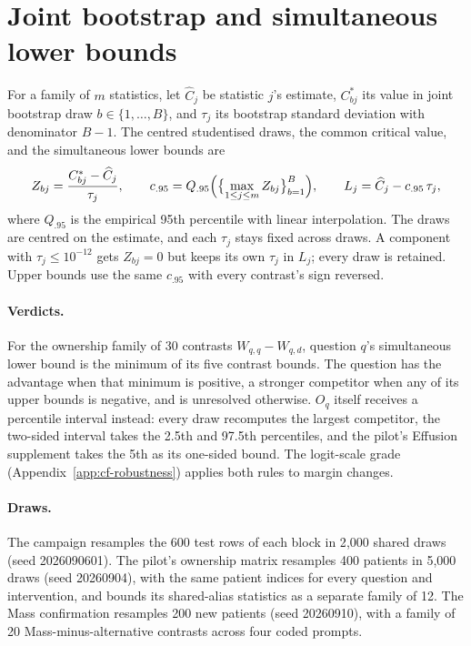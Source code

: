 \section{Joint bootstrap and simultaneous lower bounds}
\label{app:simultaneous-bounds}

For a family of $m$ statistics, let $\widehat C_j$ be statistic $j$'s estimate, $C^*_{bj}$ its value in joint bootstrap draw $b\in\{1,\dots,B\}$, and $\tau_j$ its bootstrap standard deviation with denominator $B-1$. The centred studentised draws, the common critical value, and the simultaneous lower bounds are
\begin{equation}
Z_{bj}=\frac{C^*_{bj}-\widehat C_j}{\tau_j},\qquad
c_{.95}=Q_{.95}\Bigl(\bigl\{\max_{1\leq j\leq m}Z_{bj}\bigr\}_{b=1}^{B}\Bigr),\qquad
L_j=\widehat C_j-c_{.95}\,\tau_j,
\label{eq:max-t}
\end{equation}
where $Q_{.95}$ is the empirical 95th percentile with linear interpolation. The draws are centred on the estimate, and each $\tau_j$ stays fixed across draws. A component with $\tau_j\leq10^{-12}$ gets $Z_{bj}=0$ but keeps its own $\tau_j$ in $L_j$; every draw is retained. Upper bounds use the same $c_{.95}$ with every contrast's sign reversed.

\paragraph{Verdicts.} For the ownership family of 30 contrasts $W_{q,q}-W_{q,d}$, question $q$'s simultaneous lower bound is the minimum of its five contrast bounds. The question has the advantage when that minimum is positive, a stronger competitor when any of its upper bounds is negative, and is unresolved otherwise. $O_q$ itself receives a percentile interval instead: every draw recomputes the largest competitor, the two-sided interval takes the 2.5th and 97.5th percentiles, and the pilot's Effusion supplement takes the 5th as its one-sided bound. The logit-scale grade (Appendix~\ref{app:cf-robustness}) applies both rules to margin changes.

\paragraph{Draws.} The campaign resamples the 600 test rows of each block in 2{,}000 shared draws (seed 2026090601). The pilot's ownership matrix resamples 400 patients in 5{,}000 draws (seed 20260904), with the same patient indices for every question and intervention, and bounds its shared-alias statistics as a separate family of 12. The Mass confirmation resamples 200 new patients (seed 20260910), with a family of 20 Mass-minus-alternative contrasts across four coded prompts.

